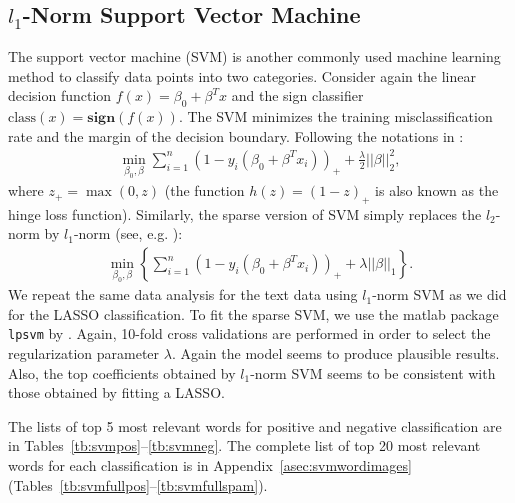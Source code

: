\documentclass[11pt]{article}
\newcommand{\note}[1]{{\em \color{red} #1}}
\newcommand{\1}[1]{{\mathbf 1}\left\{#1\right\}}        %
\begin{document}
\subsection{$l_1$-Norm Support Vector Machine}

The support vector machine (SVM) is another commonly used machine learning method to classify data points into two categories. Consider again the linear decision function $f(x) = \beta_0 + \beta^T x$ and the sign classifier $\text{class}(x) = \textbf{sign} (f(x))$. The SVM minimizes the training misclassification rate and the margin of the decision boundary. Following the notations in \cite{hastie2004entire}:
\begin{align*}
\label{eq:l2svm}
\min_{\beta_0,\beta} \sum_{i=1}^n(1-y_i(\beta_0+\beta^Tx_i))_+ + \frac{\lambda}{2} ||\beta||_2^2,
\end{align*}
where $z_+ = \max(0,z)$ (the function $h(z) = (1-z)_+$ is also known as the hinge loss function). Similarly, the sparse version of SVM simply replaces the $l_2$-norm by $l_1$-norm (see, e.g. \cite{zhu20041}):
\begin{align*}
\min_{\beta_0,\beta} \left\{ \sum_{i=1}^n(1-y_i(\beta_0+\beta^Tx_i))_+ + \lambda ||\beta||_1\right\}. 
\end{align*}
We repeat the same data analysis for the text data using $l_1$-norm SVM as we did for the LASSO classification. To fit the sparse SVM, we use the matlab package {\tt lpsvm} by \cite{fung2004feature}. Again, 10-fold cross validations are performed in order to select the regularization parameter $\lambda$. Again the model seems to produce plausible results. Also, the top coefficients obtained by $l_1$-norm SVM seems to be consistent with those obtained by fitting a LASSO.  

%

The lists of top 5 most relevant words for positive and negative classification are in Tables~\ref{tb:svmpos}--\ref{tb:svmneg}.
The complete list of top 20 most relevant words for each classification is in Appendix~\ref{asec:svmwordimages} (Tables~\ref{tb:svmfullpos}--\ref{tb:svmfullspam}).
\end{document}
